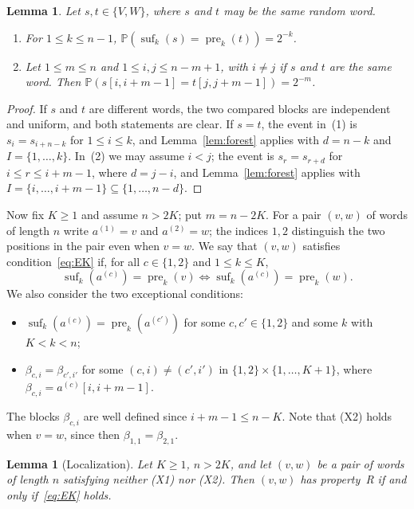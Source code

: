 \documentclass[11pt]{amsart}
\newtheorem{lemma}[theorem]{Lemma}
\theoremstyle{remark}
\numberwithin{equation}{section}
\newcommand{\pre}{\operatorname{pre}}
\newcommand{\suf}{\operatorname{suf}}
\newcommand{\PP}{\mathbb{P}}
\begin{document}
\begin{lemma}\label{lem:basic}
Let $s,t\in\{V,W\}$, where $s$ and $t$ may be the same random word.
\begin{enumerate}
\item For $1\le k\le n-1$, $\PP(\suf_k(s)=\pre_k(t))=2^{-k}$.
\item Let $1\le m\le n$ and $1\le i,j\le n-m+1$, with $i\ne j$ if $s$ and $t$ are the same word. Then $\PP(s[i,i+m-1]=t[j,j+m-1])=2^{-m}$.
\end{enumerate}
\end{lemma}

\begin{proof}
If $s$ and $t$ are different words, the two compared blocks are independent and uniform, and both statements are clear. If $s=t$, the event in~(1) is $s_i=s_{i+n-k}$ for $1\le i\le k$, and Lemma~\ref{lem:forest} applies with $d=n-k$ and $I=\{1,\dots,k\}$. In~(2) we may assume $i<j$; the event is $s_{r}=s_{r+d}$ for $i\le r\le i+m-1$, where $d=j-i$, and Lemma~\ref{lem:forest} applies with $I=\{i,\dots,i+m-1\}\subseteq\{1,\dots,n-d\}$.
\end{proof}

Now fix $K\ge1$ and assume $n>2K$; put $m=n-2K$. For a pair $(v,w)$ of words of length $n$ write $a^{(1)}=v$ and $a^{(2)}=w$; the indices $1,2$ distinguish the two positions in the pair even when $v=w$. We say that $(v,w)$ satisfies condition~\eqref{eq:EK} if, for all $c\in\{1,2\}$ and $1\le k\le K$,
\begin{equation}\label{eq:EK}
  \suf_k(a^{(c)})=\pre_k(v)\iff \suf_k(a^{(c)})=\pre_k(w).
\end{equation}
We also consider the two exceptional conditions:
\begin{itemize}
\item[(X1)] $\suf_k(a^{(c)})=\pre_k(a^{(c')})$ for some $c,c'\in\{1,2\}$ and some $k$ with $K<k<n$;
\item[(X2)] $\beta_{c,i}=\beta_{c',i'}$ for some $(c,i)\ne(c',i')$ in $\{1,2\}\times\{1,\dots,K+1\}$, where $\beta_{c,i}=a^{(c)}[i,i+m-1]$.
\end{itemize}
The blocks $\beta_{c,i}$ are well defined since $i+m-1\le n-K$. Note that (X2) holds when $v=w$, since then $\beta_{1,1}=\beta_{2,1}$.

\begin{lemma}[Localization]\label{lem:local}
Let $K\ge1$, $n>2K$, and let $(v,w)$ be a pair of words of length $n$ satisfying neither \textup{(X1)} nor \textup{(X2)}. Then $(v,w)$ has property~R if and only if~\eqref{eq:EK} holds.
\end{lemma}
\end{document}

